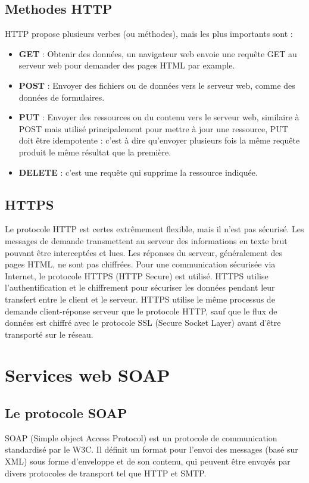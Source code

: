 \subsection{Methodes HTTP}
HTTP propose plusieurs verbes (ou méthodes), mais les plus importants sont : 
\begin{itemize}
	\item \textbf{GET} : Obtenir des données, un navigateur web envoie une requête GET au serveur web pour demander des pages HTML par example.
	\item \textbf{POST} : Envoyer des fichiers ou de données vers le serveur web, comme des données de formulaires.
	\item \textbf{PUT} : Envoyer des ressources ou du contenu vers le serveur web, similaire à POST mais utilisé principalement pour mettre à jour une ressource, PUT doit être idempotente : c'est à dire qu'envoyer plusieurs fois la même requête produit le même résultat que la première.
	\item \textbf{DELETE} : c'est une requête  qui supprime la ressource indiquée.
\end{itemize}

\subsection{HTTPS}
Le protocole HTTP est certes extrêmement flexible, mais il n'est pas sécurisé. Les messages de demande transmettent au serveur des informations en texte brut pouvant être interceptées et lues. Les réponses du serveur, généralement des pages HTML, ne sont pas chiffrées.
Pour une communication sécurisée via Internet, le protocole HTTPS (HTTP Secure) est utilisé. HTTPS utilise l'authentification et le chiffrement pour sécuriser les données pendant leur transfert entre le client et le serveur. HTTPS utilise le même processus de demande client-réponse serveur que le protocole HTTP, sauf que le flux de données est chiffré avec le protocole SSL (Secure Socket Layer) avant d'être transporté sur le réseau.

\newpage
\section{Services web SOAP} 
\subsection{Le protocole SOAP}
SOAP (Simple object Access Protocol) est un protocole de communication standardisé par le W3C. 
Il définit un format pour l'envoi des messages (basé sur XML) sous forme d'enveloppe et de son contenu, qui peuvent être envoyés par divers protocoles de transport tel que HTTP et SMTP.
				
